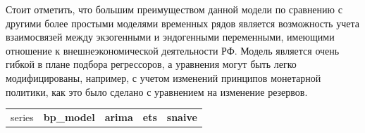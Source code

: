 \documentclass[a4paper, 14pt]{extarticle}
\begin{document}
Стоит отметить, что большим преимуществом данной модели по сравнению с другими более простыми моделями временных рядов является возможность учета взаимосвязей между экзогенными и эндогенными переменными, имеющими отношение к внешнеэкономической деятельности РФ.
Модель является очень гибкой в плане подбора регрессоров, а уравнения могут быть легко модифицированы, например, с учетом изменений принципов монетарной политики, как это было сделано с уравнением на изменение резервов.


\newpage
\thispagestyle{empty}

\begin{center}
	\small
	\begin{tabular}{l|rr|rr|rr|rr}
		\toprule
		\multirow{2}{*}{series}&\multicolumn{2}{c|}{\textbf{bp\_model}}&\multicolumn{2}{c|}{\textbf{arima}}&\multicolumn{2}{c|}{\textbf{ets}}&\multicolumn{2}{c}{\textbf{snaive}}\\
		

\end{tabular}
\end{center}
\end{document}
